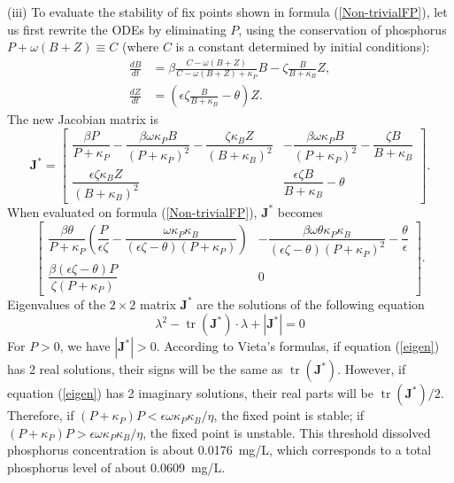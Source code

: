\documentclass{article}
\DeclareMathOperator{\tr}{tr}
\renewcommand\vec{\mathbf}
\begin{document}
(iii) To evaluate the stability of fix points shown in formula (\ref{Non-trivialFP}), let us first rewrite the ODEs by eliminating $P$, using the conservation of phosphorus $P + \omega(B+Z) \equiv C$ (where $C$ is a constant determined by initial conditions):
\begin{align*}
    \frac{d B}{d t} &= \beta\frac{C - \omega(B + Z)}{C - \omega(B + Z) + \kappa_P}B - \zeta\frac{B}{B + \kappa_B}Z, \\
    \frac{d Z}{d t} &= (\epsilon\zeta\frac{B}{B + \kappa_B} - \theta) Z.
\end{align*}
The new Jacobian matrix is
\begin{equation*}
    \vec{J^\ast} = \begin{bmatrix}
    \dfrac{\beta P}{P + \kappa_P} - \dfrac{\beta \omega \kappa_P B}{(P + \kappa_P)^2} - \dfrac{\zeta \kappa_B Z}{(B + \kappa_B)^2} & - \dfrac{\beta \omega \kappa_P B}{(P + \kappa_P)^2} - \dfrac{\zeta B}{B + \kappa_B}  \\[1.5em]
    \dfrac{\epsilon \zeta \kappa_B Z}{(B + \kappa_B)^2} & \dfrac{\epsilon \zeta B}{B + \kappa_B} - \theta 
    \end{bmatrix}.
\end{equation*}
When evaluated on formula (\ref{Non-trivialFP}), $\vec{J^\ast}$ becomes
\begin{equation*}
    \begin{bmatrix}
    \dfrac{\beta \theta}{P + \kappa_P}(\dfrac{P}{\epsilon\zeta} - \dfrac{ \omega \kappa_P \kappa_B}{(\epsilon\zeta - \theta)(P + \kappa_P)}) & - \dfrac{\beta \omega \theta \kappa_P \kappa_B}{(\epsilon\zeta - \theta)(P + \kappa_P)^2} - \dfrac{\theta}{\epsilon}  \\[1.5em]
    \dfrac{\beta (\epsilon\zeta - \theta) P}{\zeta(P + \kappa_P)} & 0 
    \end{bmatrix}.
\end{equation*}
Eigenvalues of the $2 \times 2$ matrix  $\vec{J^\ast}$ are the solutions of the following equation
\begin{equation}
    \lambda^2 - \tr(\vec{J^\ast}) \cdot \lambda + |\vec{J^\ast}| = 0 \label{eigen}
\end{equation}
For $P > 0$, we have $|\vec{J^\ast}| > 0$. According to Vieta's formulas, if equation (\ref{eigen}) has 2 real solutions, their signs will be the same as $\tr(\vec{J^\ast})$. However, if equation (\ref{eigen}) has 2 imaginary solutions, their real parts will be $\tr(\vec{J^\ast})/2$. Therefore, if $(P + \kappa_P)P < \epsilon\omega\kappa_P\kappa_B/\eta$, the fixed point is stable; if $(P + \kappa_P)P > \epsilon\omega\kappa_P\kappa_B/\eta$, the fixed point is unstable. This threshold dissolved phosphorus concentration is about \SI{0.0176}{mg/L}, which corresponds to a total phosphorus level of about \SI{0.0609}{mg/L}.
\end{document}
